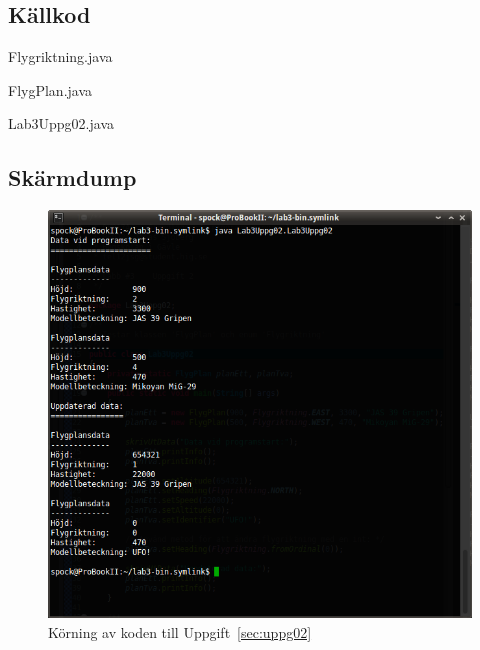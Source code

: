 \subsection{Källkod}
\caption{Flygriktning.java}
\label{src:flygriktning}

\caption{FlygPlan.java}
\label{src:flygplan}

\caption{Lab3Uppg02.java}
\label{src:uppg02}


\subsection{Skärmdump}
\begin{figure}[htbp]
    \centering
        \includegraphics[width=\linewidth]{img/02.png}
    \caption{Körning av koden till Uppgift~\ref{sec:uppg02}}
    \label{fig:uppg02-screenshot}
\end{figure}

